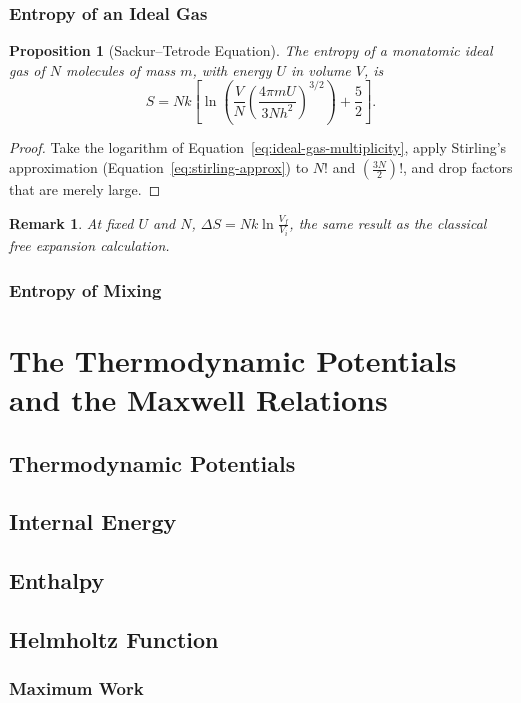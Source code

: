 \documentclass{article}
\newtheorem{remark}{Remark}
\newtheorem{proposition}{Proposition}
\begin{document}
\subsubsection{Entropy of an Ideal Gas}
\begin{proposition}[Sackur--Tetrode Equation]
    The entropy of a monatomic ideal gas of $N$ molecules of mass $m$, with energy $U$ in volume $V$, is
    \begin{equation}
        \label{eq:sackur-tetrode}
        S = Nk\left[\ln\left(\frac{V}{N}\left(\frac{4\pi mU}{3Nh^2}\right)^{3/2}\right) + \frac{5}{2}\right].
    \end{equation}
\end{proposition}
\begin{proof}
    Take the logarithm of Equation~\eqref{eq:ideal-gas-multiplicity}, apply Stirling's approximation (Equation~\eqref{eq:stirling-approx}) to $N!$ and $\left(\frac{3N}{2}\right)!$, and drop factors that are merely large.
\end{proof}
\begin{remark}
    At fixed $U$ and $N$, $\Delta S = Nk\ln\frac{V_f}{V_i}$, the same result as the classical free expansion calculation.
\end{remark}
\subsubsection{Entropy of Mixing}

\section{The Thermodynamic Potentials and the Maxwell Relations}
\subsection{Thermodynamic Potentials}
\subsection{Internal Energy}
\subsection{Enthalpy}
\subsection{Helmholtz Function}
\subsubsection{Maximum Work}
\end{document}
